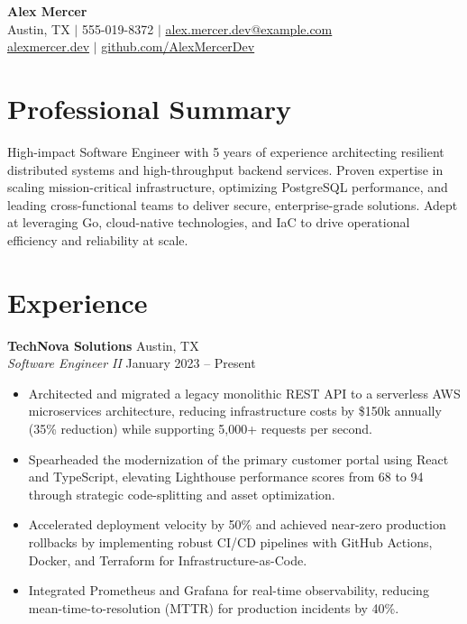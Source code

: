 \documentclass[10pt,a4paper]{article}
\begin{document}
\begin{center}
    {\LARGE \textbf{Alex Mercer}} \\
    Austin, TX $|$ 555-019-8372 $|$ \href{mailto:alex.mercer.dev@example.com}{alex.mercer.dev@example.com} \\
    \href{https://alexmercer.dev}{alexmercer.dev} $|$ \href{https://github.com/AlexMercerDev}{github.com/AlexMercerDev}
\end{center}

\section{Professional Summary}
High-impact Software Engineer with 5 years of experience architecting resilient distributed systems and high-throughput backend services. Proven expertise in scaling mission-critical infrastructure, optimizing PostgreSQL performance, and leading cross-functional teams to deliver secure, enterprise-grade solutions. Adept at leveraging Go, cloud-native technologies, and IaC to drive operational efficiency and reliability at scale.

\section{Experience}
\textbf{TechNova Solutions} \hfill Austin, TX \\
\textit{Software Engineer II} \hfill January 2023 -- Present
\begin{itemize}
    \item Architected and migrated a legacy monolithic REST API to a serverless AWS microservices architecture, reducing infrastructure costs by \$150k annually (35\% reduction) while supporting 5,000+ requests per second.
    \item Spearheaded the modernization of the primary customer portal using React and TypeScript, elevating Lighthouse performance scores from 68 to 94 through strategic code-splitting and asset optimization.
    \item Accelerated deployment velocity by 50\% and achieved near-zero production rollbacks by implementing robust CI/CD pipelines with GitHub Actions, Docker, and Terraform for Infrastructure-as-Code.
    \item Integrated Prometheus and Grafana for real-time observability, reducing mean-time-to-resolution (MTTR) for production incidents by 40\%.
\end{itemize}
\end{document}
